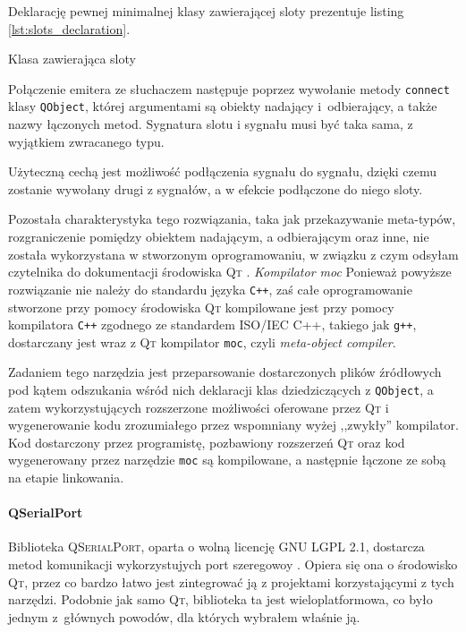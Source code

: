 Deklarację pewnej minimalnej klasy zawierającej sloty prezentuje listing \ref{lst:slots_declaration}.

\begin{listing}
  
  \caption{Klasa zawierająca sloty}
  \label{lst:slots_declaration}
\end{listing}

Połączenie emitera ze słuchaczem następuje poprzez wywołanie metody \verb|connect| klasy \verb|QObject|, której argumentami są obiekty nadający i~odbierający, a także nazwy łączonych metod. Sygnatura slotu i sygnału musi być taka sama, z wyjątkiem zwracanego typu.

Użyteczną cechą jest możliwość podłączenia sygnału do sygnału, dzięki czemu zostanie wywołany drugi z sygnałów, a w efekcie podłączone do niego sloty.

Pozostała charakterystyka tego rozwiązania, taka jak przekazywanie meta-typów, rozgraniczenie pomiędzy obiektem nadającym, a odbierającym oraz inne, nie została wykorzystana w stworzonym oprogramowaniu, w związku z czym odsyłam czytelnika do dokumentacji środowiska \textsc{Qt} \citep{Qt}.
\newline
\newline
\textsl{Kompilator moc} Ponieważ powyższe rozwiązanie nie należy do standardu języka \verb|C++|, zaś całe oprogramowanie stworzone przy pomocy środowiska \textsc{Qt} kompilowane jest przy pomocy kompilatora \verb|C++| zgodnego ze standardem ISO/IEC C++\citep{CPPStandard}, takiego jak \texttt{g++}, dostarczany jest wraz z \textsc{Qt} kompilator \texttt{moc}, czyli \textsl{meta-object compiler}.

Zadaniem tego narzędzia jest przeparsowanie dostarczonych plików źródłowych pod kątem odszukania wśród nich deklaracji klas dziedziczących z \verb|QObject|, a zatem wykorzystujących rozszerzone możliwości oferowane przez \textsc{Qt} i wygenerowanie kodu zrozumiałego przez wspomniany wyżej ,,zwykły'' kompilator. Kod dostarczony przez programistę, pozbawiony rozszerzeń \textsc{Qt} oraz kod wygenerowany przez narzędzie \texttt{moc} są kompilowane, a następnie łączone ze sobą na etapie linkowania.

\paragraph{QSerialPort}
Biblioteka \textsc{QSerialPort}, oparta o wolną licencję \textsc{GNU LGPL 2.1}, dostarcza metod komunikacji wykorzystujych port szeregowoy . Opiera się ona o środowisko \textsc{Qt}, przez co bardzo łatwo jest zintegrować ją z projektami korzystającymi z tych narzędzi. Podobnie jak samo \textsc{Qt}, biblioteka ta jest wieloplatformowa, co było jednym z~głównych powodów, dla których wybrałem właśnie ją.


